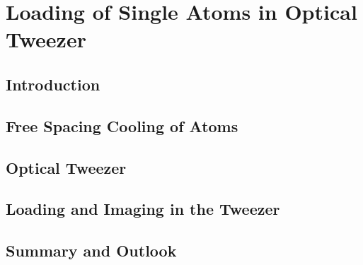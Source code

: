 
\chapter{Loading of Single Atoms in Optical Tweezer}
\label{ch:loading}

\section{Introduction}
\label{ch:loading:introduction}

\section{Free Spacing Cooling of Atoms}
\label{ch:loading:free-space}


\section{Optical Tweezer}
\label{ch:loading:tweezer}


\section{Loading and Imaging in the Tweezer}
\label{ch:loading:loading}


\section{Summary and Outlook}
\label{ch:loading:summary}

